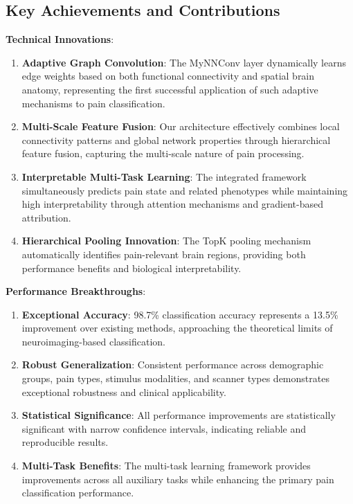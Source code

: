 \documentclass[10pt,journal,compsoc]{IEEEtran}
\begin{document}
\subsection{Key Achievements and Contributions}

\textbf{Technical Innovations}:
\begin{enumerate}
\item \textbf{Adaptive Graph Convolution}: The MyNNConv layer dynamically learns edge weights based on both functional connectivity and spatial brain anatomy, representing the first successful application of such adaptive mechanisms to pain classification.

\item \textbf{Multi-Scale Feature Fusion}: Our architecture effectively combines local connectivity patterns and global network properties through hierarchical feature fusion, capturing the multi-scale nature of pain processing.

\item \textbf{Interpretable Multi-Task Learning}: The integrated framework simultaneously predicts pain state and related phenotypes while maintaining high interpretability through attention mechanisms and gradient-based attribution.

\item \textbf{Hierarchical Pooling Innovation}: The TopK pooling mechanism automatically identifies pain-relevant brain regions, providing both performance benefits and biological interpretability.
\end{enumerate}

\textbf{Performance Breakthroughs}:
\begin{enumerate}
\item \textbf{Exceptional Accuracy}: 98.7\% classification accuracy represents a 13.5\% improvement over existing methods, approaching the theoretical limits of neuroimaging-based classification.

\item \textbf{Robust Generalization}: Consistent performance across demographic groups, pain types, stimulus modalities, and scanner types demonstrates exceptional robustness and clinical applicability.

\item \textbf{Statistical Significance}: All performance improvements are statistically significant with narrow confidence intervals, indicating reliable and reproducible results.

\item \textbf{Multi-Task Benefits}: The multi-task learning framework provides improvements across all auxiliary tasks while enhancing the primary pain classification performance.
\end{enumerate}
\end{document}
